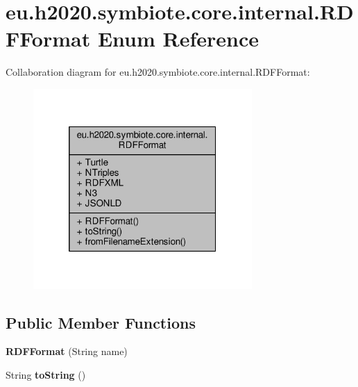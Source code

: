 \hypertarget{enumeu_1_1h2020_1_1symbiote_1_1core_1_1internal_1_1RDFFormat}{}\section{eu.\+h2020.\+symbiote.\+core.\+internal.\+R\+D\+F\+Format Enum Reference}
\label{enumeu_1_1h2020_1_1symbiote_1_1core_1_1internal_1_1RDFFormat}


Collaboration diagram for eu.\+h2020.\+symbiote.\+core.\+internal.\+R\+D\+F\+Format\+:\nopagebreak
\begin{figure}[H]
\begin{center}
\leavevmode
\includegraphics[width=236pt]{enumeu_1_1h2020_1_1symbiote_1_1core_1_1internal_1_1RDFFormat__coll__graph}
\end{center}
\end{figure}
\subsection*{Public Member Functions}
\begin{DoxyCompactItemize}
\item 
\mbox{\label{enumeu_1_1h2020_1_1symbiote_1_1core_1_1internal_1_1RDFFormat_a0ac49ed0bfd1fbee1e68d38f22ad47d5}} 
{\bfseries R\+D\+F\+Format} (String name)
\item 
\mbox{\label{enumeu_1_1h2020_1_1symbiote_1_1core_1_1internal_1_1RDFFormat_af9f3124bc9ed44a85e6846ff5bb0d955}} 
String {\bfseries to\+String} ()
\end{DoxyCompactItemize}
